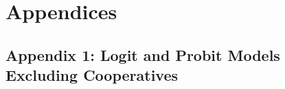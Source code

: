 \documentclass[a4paper,nobind]{templates/ociamthesis}
\begin{document}
\hypertarget{refs}{}
\begin{CSLReferences}{0}{0}
\end{CSLReferences}

\newpage

\hypertarget{appendices}{%
\chapter{Appendices}\label{appendices}}

\hypertarget{appendix-1-logit-and-probit-models-excluding-cooperatives}{%
\section{Appendix 1: Logit and Probit Models Excluding Cooperatives}\label{appendix-1-logit-and-probit-models-excluding-cooperatives}}
\end{document}
